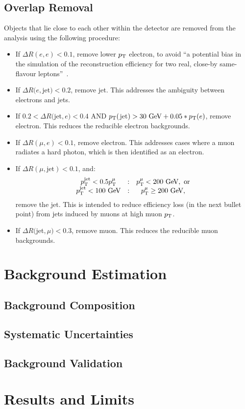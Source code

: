 \subsection{Overlap Removal}\label{sec:overlap-removal}
Objects that lie close to each other within the detector are removed from the analysis using the following procedure:
\begin{itemize}
	\item If $\Delta R(e, e) < 0.1$, remove lower $p_{\text{T}}$ electron, to avoid ``a potential bias in the simulation of the reconstruction efficiency for two real, close-by same-flavour leptons''~\cite{Adams:1700874}.
	\item If $\Delta R(e, $jet$) < 0.2$, remove jet. This addresses the ambiguity between electrons and jets.
	\item If $0.2 < \Delta R($jet$, e) < 0.4$ AND $p_{\text{T}}($jet$) > 30~\mbox{GeV} + 0.05 * p_{\text{T}}(e)$, remove electron. This reduces the reducible electron backgrounds.
	\item If $\Delta R(\mu, e) < 0.1$, remove electron. This addresses cases where a muon radiates a hard photon, which is then identified as an electron.
	\item If $\Delta R(\mu, \mbox{jet})<0.1$, and:
	\begin{equation}
		\begin{array}{ccc}
			p_{\text{T}}^{\mathrm{jet}}<0.5 p_{\text{T}}^{\mu} & : & p_{\text{T}}^{\mu} < 200~\mbox{GeV},\ \mbox{or} \\
			p_{\text{T}}^{\mathrm{jet}}<100~\mbox{GeV} & : & p_{\text{T}}^{\mu} \geq 200~\mbox{GeV},
		\end{array}
	\end{equation}
	remove the jet. This is intended to reduce efficiency loss (in the next bullet point) from jets induced by muons at high muon $p_{\text{T}}$. 
	\item If $\Delta R($jet$, \mu) < 0.3$, remove muon. This reduces the reducible muon backgrounds.
\end{itemize}


\section{Background Estimation}

\subsection{Background Composition}

\subsection{Systematic Uncertainties}

\subsection{Background Validation}

\section{Results and Limits}